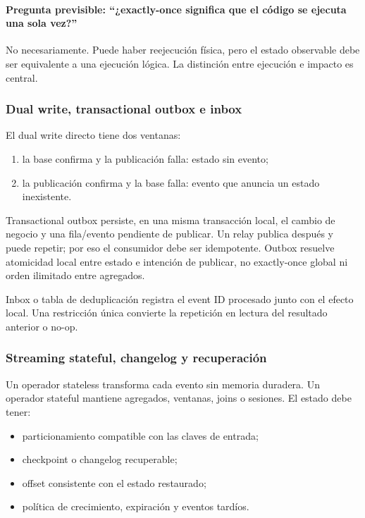 \documentclass[variant=docente,cover=institutional,mode=screen]{ua-engineering-v6-article}
\begin{document}
\paragraph{Pregunta previsible: ``¿exactly-once significa que el código se ejecuta una sola vez?''}
No necesariamente. Puede haber reejecución física, pero el estado observable debe ser equivalente a una ejecución lógica. La distinción entre ejecución e impacto es central.

\subsubsection{Dual write, transactional outbox e inbox}

El dual write directo tiene dos ventanas:
\begin{enumerate}
\item la base confirma y la publicación falla: estado sin evento;
\item la publicación confirma y la base falla: evento que anuncia un estado inexistente.
\end{enumerate}

Transactional outbox persiste, en una misma transacción local, el cambio de negocio y una fila/evento pendiente de publicar. Un relay publica después y puede repetir; por eso el consumidor debe ser idempotente. Outbox resuelve atomicidad local entre estado e intención de publicar, no exactly-once global ni orden ilimitado entre agregados.

Inbox o tabla de deduplicación registra el event ID procesado junto con el efecto local. Una restricción única convierte la repetición en lectura del resultado anterior o no-op.

\subsubsection{Streaming stateful, changelog y recuperación}

Un operador stateless transforma cada evento sin memoria duradera. Un operador stateful mantiene agregados, ventanas, joins o sesiones. El estado debe tener:
\begin{itemize}
\item particionamiento compatible con las claves de entrada;
\item checkpoint o changelog recuperable;
\item offset consistente con el estado restaurado;
\item política de crecimiento, expiración y eventos tardíos.
\end{itemize}
\end{document}
